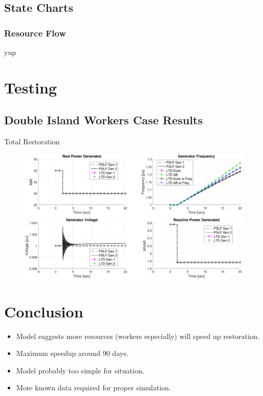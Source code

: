 \documentclass[14pt, unknownkeysallowed]{beamer}
\begin{document}
\subsection{State Charts}
\begin{frame}
\frametitle{Resource Flow}
yup
\end{frame}

\section{Testing}
\subsection{Double Island Workers Case Results}
\begin{frame}
Total Restoration
\begin{figure}
	\includegraphics[width=\linewidth]{noGovExcLoadStepDsys}
\end{figure}
\end{frame}

\section{Conclusion}
\begin{frame}
\begin{itemize}
	\item Model suggests more resources (workers especially) will speed up restoration.
	\item Maximum speedup around 90 days.
	\item Model probably too simple for situation.
	\item More known data required for proper simulation.
\end{itemize}
\end{frame}
\end{document}
